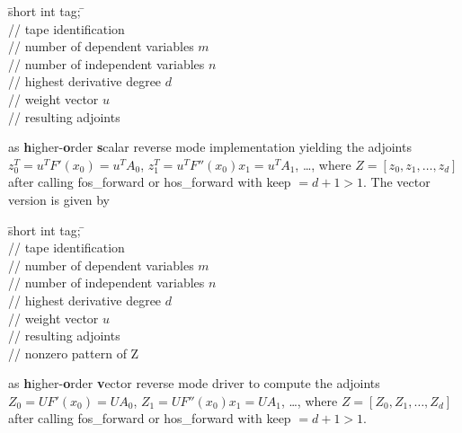 \documentclass[11pt,twoside]{article}
\begin{document}
\begin{tabbing}
\hspace{0.5in}\={\sf short int tag;} \hspace{1.1in}\= \kill    %
\\
         \> // tape identification \\
                 \> // number of  dependent variables $m$\\
                 \> // number of independent variables $n$\\
                 \> // highest derivative degree $d$\\
           \> // weight vector $u$\\
      \> // resulting adjoints
\end{tabbing}                 
as {\bf h}igher-{\bf o}rder {\bf s}calar reverse mode implementation yielding
the adjoints $z_0^T=u^T F'(x_0)=u^T A_0$, $z_1^T=u^T F''(x_0)x_1=u^T A_1$, 
\ldots, where $Z=[z_0,z_1,\ldots,z_d]$ after calling  {\sf fos\_forward} or 
{\sf hos\_forward} with {\sf keep} $=d+1>1$. The vector version is given by
\begin{tabbing}
\hspace{0.5in}\={\sf short int tag;} \hspace{1.1in}\= \kill    %
\\
         \> // tape identification \\
                 \> // number of  dependent variables $m$\\
                 \> // number of independent variables $n$\\
                 \> // highest derivative degree $d$\\
        \> // weight vector $u$\\
   \> // resulting adjoints\\
    \> // nonzero pattern of {\sf Z}
\end{tabbing}                 
as {\bf h}igher-{\bf o}rder {\bf v}ector reverse mode driver to compute
the adjoints $Z_0=U F'(x_0)=U A_0$, $Z_1=U F''(x_0)x_1=U A_1$, 
\ldots, where $Z=[Z_0,Z_1,\ldots,Z_d]$ after calling  {\sf fos\_forward} or 
{\sf hos\_forward} with {\sf keep} $=d+1>1$. 
\end{document}
